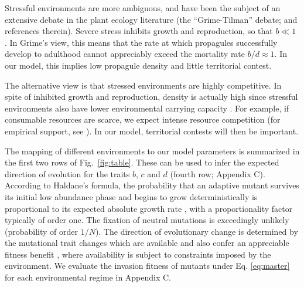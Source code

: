 \documentclass[11pt]{article}
\begin{document}
Stressful environments are more ambiguous, and have been the subject of an extensive debate in the plant ecology literature (the ``Grime-Tilman'' debate; \citealt{aerts_1999} and references therein). Severe stress inhibits growth and reproduction, so that $b\ll 1$ \citep{grime_1974,grime_1977}. In Grime's view, this means that the rate at which propagules successfully develop to adulthood cannot appreciably exceed the mortality rate $b/d\approx 1$. In our model, this implies low propagule density and little territorial contest. 

The alternative view is that stressed environments are highly competitive. In spite of inhibited growth and reproduction, density is actually high since stressful environments also have lower environmental carrying capacity \citep{taylor_1990}. For example, if consumable resources are scarce, we expect intense resource competition (for empirical support, see \citealt{davis_1998}). In our model, territorial contests will then be important.

The mapping of different environments to our model parameters is summarized in the first two rows of Fig.~\ref{fig:table}. These can be used to infer the expected direction of evolution for the traits $b$, $c$ and $d$ (fourth row; Appendix C). According to Haldane's formula, the probability that an adaptive mutant survives its initial low abundance phase and begins to grow deterministically is proportional to its expected absolute growth rate \citep{haldane_1927,uecker_2011}, with a proportionality factor typically of order one. The fixation of neutral mutations is exceedingly unlikely (probability of order $1/N$). The direction of evolutionary change is determined by the mutational trait changes which are available and also confer an appreciable fitness benefit \citep{yampolsky_2001}, where availability is subject to constraints imposed by the environment. We evaluate the  invasion fitness of mutants under Eq. \eqref{eq:master} for each environmental regime in Appendix C.
\end{document}
